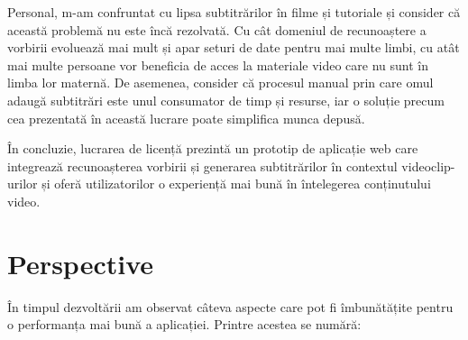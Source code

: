 \par
Personal, m-am confruntat cu lipsa subtitrărilor în filme și tutoriale și consider că această
problemă nu este încă rezolvată. Cu cât domeniul de recunoaștere a vorbirii evoluează mai mult
și apar seturi de date pentru mai multe limbi, cu atât mai multe persoane vor beneficia de acces
la materiale video care nu sunt în limba lor maternă. De asemenea, consider că procesul manual
prin care omul adaugă subtitrări este unul consumator de timp și resurse, iar o soluție precum
cea prezentată în această lucrare poate simplifica munca depusă.
\par
În concluzie, lucrarea de licență prezintă un prototip de aplicație web care integrează
recunoașterea vorbirii și generarea subtitrărilor în contextul videoclip-urilor și oferă
utilizatorilor o experiență mai bună în întelegerea conținutului video.

\section{Perspective}
\par
În timpul dezvoltării am observat câteva aspecte care pot fi îmbunătățite pentru o 
performanța mai bună a aplicației. Printre acestea se numără:


